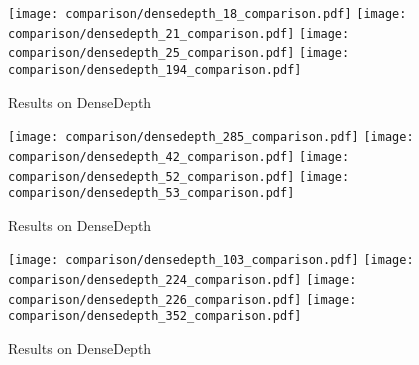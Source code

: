 \begin{figure}
  \texttt{[image: comparison/densedepth\_18\_comparison.pdf]}
  \texttt{[image: comparison/densedepth\_21\_comparison.pdf]}
  \texttt{[image: comparison/densedepth\_25\_comparison.pdf]}
  \texttt{[image: comparison/densedepth\_194\_comparison.pdf]}
  \caption{Results on DenseDepth}
\end{figure}
\begin{figure}
  \texttt{[image: comparison/densedepth\_285\_comparison.pdf]}
  \texttt{[image: comparison/densedepth\_42\_comparison.pdf]}
  \texttt{[image: comparison/densedepth\_52\_comparison.pdf]}
  \texttt{[image: comparison/densedepth\_53\_comparison.pdf]}
  \caption{Results on DenseDepth}
\end{figure}
\begin{figure}
  \texttt{[image: comparison/densedepth\_103\_comparison.pdf]}
  \texttt{[image: comparison/densedepth\_224\_comparison.pdf]}
  \texttt{[image: comparison/densedepth\_226\_comparison.pdf]}
  \texttt{[image: comparison/densedepth\_352\_comparison.pdf]}
  \caption{Results on DenseDepth}
\end{figure}
